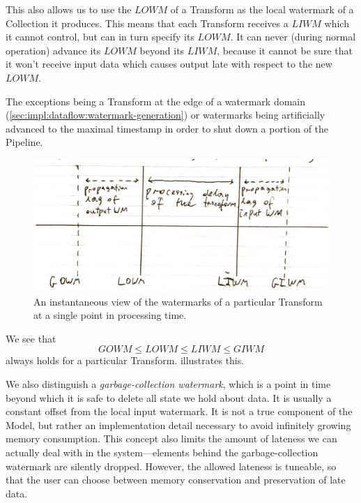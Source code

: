 This also allows us to use the $\mathit{LOWM}$ of a Transform as the local watermark of a Collection it produces.
This means that each Transform receives a $\mathit{LIWM}$ which it cannot control, but can in turn specify its $\mathit{LOWM}$.
It can never (during normal operation\footnotemark) advance its $\mathit{LOWM}$ beyond its $\mathit{LIWM}$, because it cannot be sure that it won't receive input data which causes output late with respect to the new $\mathit{LOWM}$.

\footnotetext
{
The exceptions being a Transform at the edge of a watermark domain (\cref{sec:impl:dataflow:watermark-generation}) or watermarks being artificially advanced to the maximal timestamp in order to shut down a portion of the Pipeline.
} 

\begin{figure}[t]
	\includegraphics[width=\textwidth]{images/temp/lwm-transform-instantaneous}
	\caption{An instantaneous view of the watermarks of a particular Transform at a single point in processing time.}
	\label{fig:impl:lwm-instantaneous}
\end{figure}

We see that \[ \mathit{GOWM} \leq \mathit{LOWM} \leq \mathit{LIWM} \leq \mathit{GIWM} \] always holds for a particular Transform.  illustrates this.

We also distinguish a \emph{garbage-collection watermark}, which is a point in time beyond which it is safe to delete all state we hold about data.
It is usually a constant offset from the local input watermark.
It is not a true component of the Model, but rather an implementation detail necessary to avoid infinitely growing memory consumption.
This concept also limits the amount of lateness we can actually deal with in the system---elements behind the garbage-collection watermark are silently dropped.
However, the allowed lateness is tuneable, so that the user can choose between memory conservation and preservation of late data.

